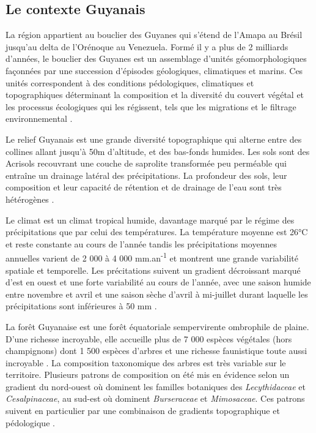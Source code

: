 \documentclass[
  11pt,
  french,
  A4paper,
  extrafontsizes,onecolumn,openright
  ]{memoir}
\begin{document}
\subsection{Le contexte Guyanais}\label{le-contexte-guyanais}

La région appartient au bouclier des Guyanes qui s'étend de l'Amapa au
Brésil jusqu'au delta de l'Orénoque au Venezuela. Formé il y a plus de 2
milliards d'années, le bouclier des Guyanes est un assemblage d'unités
géomorphologiques façonnées par une succession d'épisodes géologiques,
climatiques et marins. Ces unités correspondent à des conditions
pédologiques, climatiques et topographiques déterminant la composition
et la diversité du couvert végétal et les processus écologiques qui les
régissent, tels que les migrations et le filtrage environnemental
\autocite{Guitet2015}.

Le relief Guyanais est une grande diversité topographique qui alterne
entre des collines allant jusqu'à 50m d'altitude, et des bas-fonds
humides. Les sols sont des Acrisols recouvrant une couche de saprolite
transformée peu perméable qui entraîne un drainage latéral des
précipitations. La profondeur des sols, leur composition et leur
capacité de rétention et de drainage de l'eau sont très hétérogènes
\autocites{Ferry2010}{Robert2003}.

Le climat est un climat tropical humide, davantage marqué par le régime
des précipitations que par celui des températures. La température
moyenne est 26°C et reste constante au cours de l'année tandis les
précipitations moyennes annuelles varient de 2 000 à 4 000
mm.an\textsuperscript{-1} et montrent une grande variabilité spatiale et
temporelle. Les précitations suivent un gradient décroissant marqué
d'est en ouest et une forte variabilité au cours de l'année, avec une
saison humide entre novembre et avril et une saison sèche d'avril à
mi-juillet durant laquelle les précipitations sont inférieures à 50 mm
\autocite{Wagner2011}.

La forêt Guyanaise est une forêt équatoriale sempervirente ombrophile de
plaine. D'une richesse incroyable, elle accueille plus de 7 000 espèces
végétales (hors champignons) dont 1 500 espèces d'arbres et une richesse
faunistique toute aussi incroyable \autocite{DeNoter2008}. La
composition taxonomique des arbres est très variable sur le territoire.
Plusieurs patrons de composition on été mis en évidence selon un
gradient du nord-ouest où dominent les familles botaniques des
\emph{Lecythidaceae} et \emph{Cesalpinaceae}, au sud-est où dominent
\emph{Burseraceae} et \emph{Mimosaceae}. Ces patrons suivent en
particulier par une combinaison de gradients topographique et
pédologique \autocites{Sabatier1989}[ cf
Toto]{Sabatier1997}{Guitet2015}.
\end{document}
